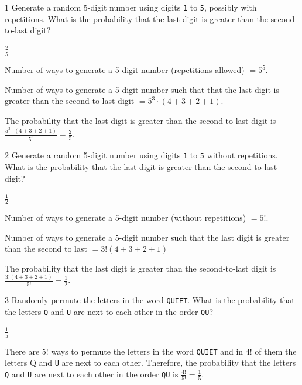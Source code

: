 \documentclass[12pt]{article}
\begin{document}


\begin{problem}{1}
    Generate a random 5-digit number using digits \texttt{1} to \texttt{5}, possibly with repetitions.
    What is the probability that the last digit is greater than the second-to-last digit?
\end{problem}

\begin{solution}
    \bbni $\frac{2}{5}$

    Number of ways to generate a 5-digit number (repetitions allowed) $ = 5^5$. 
    
    Number of ways to generate a 5-digit number such that that the last digit is greater than the second-to-last digit $=5^3 \cdot (4 + 3 + 2 + 1)$.
    
    The probability that the last digit is greater than the second-to-last digit is $\frac{5^3 \cdot (4 + 3 + 2 + 1)}{5^5} = \frac{2}{5}$. 
\end{solution}

\bbni 

\begin{problem}{2}
    Generate a random 5-digit number using digits \texttt{1} to \texttt{5} without repetitions.
    What is the probability that the last digit is greater than the second-to-last digit?
\end{problem}

\begin{solution}
    \bbni $\frac{1}{2}$

    Number of ways to generate a 5-digit number (without repetitions) $ = 5!$.
    
    Number of ways to generate a 5-digit number such that the last digit is greater than the second to last $ = 3!(4 + 3 + 2 + 1)$

    The probability that the last digit is greater than the second-to-last digit is $\frac{3!(4+3+2+1)}{5!} = \frac{1}{2}$. 
\end{solution}

\bbni 

\begin{problem}{3}
    Randomly permute the letters in the word \texttt{QUIET}.
    What is the probability that the letters \texttt{Q} and \texttt{U} are next to each other in the order \texttt{QU}?
\end{problem}

\begin{solution}
    \bbni $\frac{1}{5}$

    There are $5!$ ways to permute the letters in the word \texttt{QUIET} and in $4!$ of them the letters {Q} and \texttt{U} are next to each other. Therefore, the probability that the letters \texttt{Q} and \texttt{U} are next to each other in the order \texttt{QU} is $\frac{4!}{5!} = \frac{1}{5}$.
\end{solution}
\end{document}
